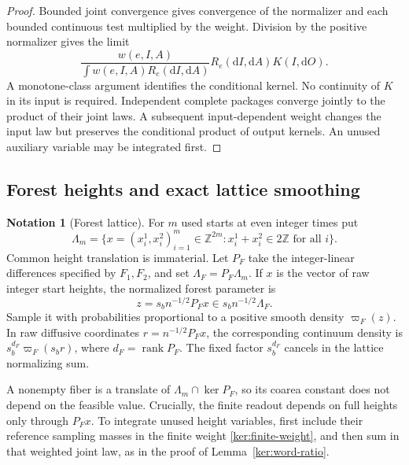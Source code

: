 \documentclass[11pt]{article}
\numberwithin{equation}{section}
\theoremstyle{definition}
\newtheorem{notation}[theorem]{Notation}
\theoremstyle{remark}
\newcommand{\1}{\mathbf 1}
\begin{document}
\begin{proof}
Bounded joint convergence gives convergence of the normalizer and
each bounded continuous test multiplied by the weight.  Division
by the positive normalizer gives the limit
\[
 \frac{w(e,I,A)}{\int w(e,I,A)R_e(\mathrm d I,\mathrm d A)}
 R_e(\mathrm d I,\mathrm d A)K(I,\mathrm d O).
\]
A monotone-class argument identifies the conditional kernel.
No continuity of \(K\) in its input is required.
Independent complete packages converge jointly to the product of
their joint laws.  A subsequent input-dependent weight changes the
input law but preserves the conditional product of output kernels.
An unused auxiliary variable may be integrated first.
\end{proof}

\subsection{Forest heights and exact lattice smoothing}

\begin{notation}[Forest lattice]\label{ker:lattice}
For \(m\) used starts at even integer times put
\[
 \Lambda_m=\{x=(x_i^1,x_i^2)_{i=1}^m\in\mathbb Z^{2m}:
                    x_i^1+x_i^2\in2\mathbb Z\text{ for all }i\}.
\]
Common height translation is immaterial.  Let \(P_F\) take the
integer-linear differences specified by \(F_1,F_2\), and set
\(\Lambda_F=P_F\Lambda_m\).
If \(x\) is the vector of raw integer start heights, the normalized
forest parameter is
\begin{equation}\label{ker:forest-units}
 z=s_b n^{-1/2}P_Fx\in s_b n^{-1/2}\Lambda_F.
\end{equation}
Sample it with probabilities proportional to a positive smooth density
\(\varpi_F(z)\).  In raw diffusive coordinates \(r=n^{-1/2}P_Fx\), the
corresponding continuum density is
\(s_b^{d_F}\varpi_F(s_br)\), where \(d_F=\operatorname{rank}P_F\).
The fixed factor \(s_b^{d_F}\) cancels in the lattice normalizing sum.
\end{notation}

A nonempty fiber is a translate of \(\Lambda_m\cap\ker P_F\), so its
coarea constant does not depend on the feasible value.  Crucially,
the finite readout depends on full heights only through \(P_Fx\).
To integrate unused height variables, first include their reference
sampling masses in the finite weight \eqref{ker:finite-weight}, and then
sum in that weighted joint law, as in the proof of
Lemma~\ref{ker:word-ratio}.
\end{document}
